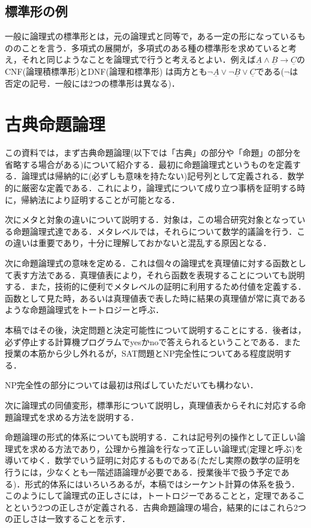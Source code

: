 \documentclass{ltjsarticle}
\theoremstyle{mystyle1}
\theoremstyle{mystyle2}
\newcommand{\uA}{\underline{A}}
\newcommand{\uB}{\underline{B}}
\newcommand{\uC}{\underline{C}}
\begin{document}
\subsection{標準形の例}
一般に論理式の標準形とは，元の論理式と同等で，ある一定の形になっているもののことを言う．多項式の展開が，多項式のある種の標準形を求めていると考え，それと同じようなことを論理式で行うと考えるとよい．例えば$\uA\wedge\uB\to\uC$のCNF(論理積標準形)とDNF(論理和標準形) は両方とも$\neg\uA\vee\neg\uB\vee\uC$である($\neg$は否定の記号．一般には2つの標準形は異なる)．
\section{古典命題論理}
この資料では，まず古典命題論理(以下では「古典」の部分や「命題」の部分を省略する場合がある)について紹介する．最初に命題論理式というものを定義する．論理式は帰納的に(必ずしも意味を持たない)記号列として定義される．数学的に厳密な定義である．これにより，論理式について成り立つ事柄を証明する時に，帰納法により証明することが可能となる．

次にメタと対象の違いについて説明する．対象は，この場合研究対象となっている命題論理式達である．メタレベルでは，それらについて数学的議論を行う．この違いは重要であり，十分に理解しておかないと混乱する原因となる．

次に命題論理式の意味を定める．これは個々の論理式を真理値に対する函数として表す方法である．真理値表により，それら函数を表現することについても説明する．また，技術的に便利でメタレベルの証明に利用するため付値を定義する．函数として見た時，あるいは真理値表で表した時に結果の真理値が常に真であるような命題論理式をトートロジーと呼ぶ．

本稿ではその後，決定問題と決定可能性について説明することにする．後者は，必ず停止する計算機プログラムでyesかnoで答えられるということである．また授業の本筋から少し外れるが，SAT問題とNP完全性についてある程度説明する．

NP完全性の部分については最初は飛ばしていただいても構わない．

次に論理式の同値変形，標準形について説明し，真理値表からそれに対応する命題論理式を求める方法を説明する．

命題論理の形式的体系についても説明する．これは記号列の操作として正しい論理式を求める方法であり，公理から推論を行なって正しい論理式(定理と呼ぶ)を導いてゆく．数学でいう証明に対応するものである(ただし実際の数学の証明を行うには，少なくとも一階述語論理が必要である．授業後半で扱う予定である)．形式的体系にはいろいろあるが，本稿ではシーケント計算の体系を扱う．このようにして論理式の正しさには，トートロジーであることと，定理であることという2つの正しさが定義される．古典命題論理の場合，結果的にはこれら2つの正しさは一致することを示す．
\end{document}
